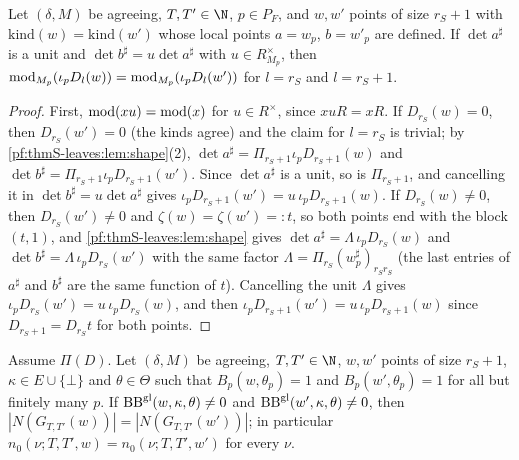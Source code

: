 \begin{lemma}\label{pf:thmS-leaves:lem:modk}
Let $(\delta,M)$ be agreeing, $T,T'\in\N$, $p\in P_F$, and $w,w'$ points of size $r_S+1$ with
$\mathrm{kind}(w)=\mathrm{kind}(w')$ whose local points $a=w_p$, $b=w'_p$ are defined. If $\det a^\sharp$ is a unit and
$\det b^\sharp=u\det a^\sharp$ with $u\in R_{M_p}^\times$, then $\mathrm{mod}_{M_p}(\iota_pD_l(w))=\mathrm{mod}_{M_p}(\iota_pD_l(w'))$
for $l=r_S$ and $l=r_S+1$.
\end{lemma}

\begin{proof}
First, $\mathrm{mod}(xu)=\mathrm{mod}(x)$ for $u\in R^\times$, since $xuR=xR$. If $D_{r_S}(w)=0$, then $D_{r_S}(w')=0$
(the kinds agree) and the claim for $l=r_S$ is trivial; by \cref{pf:thmS-leaves:lem:shape}(2),
$\det a^\sharp=\Pi_{r_S+1}\iota_pD_{r_S+1}(w)$ and $\det b^\sharp=\Pi_{r_S+1}\iota_pD_{r_S+1}(w')$. Since $\det a^\sharp$ is a
unit, so is $\Pi_{r_S+1}$, and cancelling it in $\det b^\sharp=u\det a^\sharp$ gives $\iota_pD_{r_S+1}(w')=u\,\iota_pD_{r_S+1}(w)$.
If $D_{r_S}(w)\ne0$, then $D_{r_S}(w')\ne0$ and $\zeta(w)=\zeta(w')=:t$, so both points end with the block $(t,1)$, and
\cref{pf:thmS-leaves:lem:shape} gives $\det a^\sharp=\Lambda\,\iota_pD_{r_S}(w)$ and $\det b^\sharp=\Lambda\,\iota_pD_{r_S}(w')$ with
the same factor $\Lambda=\Pi_{r_S}(w_p^\sharp)_{r_Sr_S}$ (the last entries of $a^\sharp$ and $b^\sharp$ are the same function of
$t$). Cancelling the unit $\Lambda$ gives $\iota_pD_{r_S}(w')=u\,\iota_pD_{r_S}(w)$, and then $\iota_pD_{r_S+1}(w')=u\,\iota_pD_{r_S+1}(w)$
since $D_{r_S+1}=D_{r_S}t$ for both points.
\end{proof}

\begin{proposition}\label{pf:thmS-leaves:prop:support}
Assume $\Pi(D)$. Let $(\delta,M)$ be agreeing, $T,T'\in\N$, $w,w'$ points of size $r_S+1$, $\kappa\in E\cup\{\bot\}$ and
$\theta\in\Theta$ such that $B_p(w,\theta_p)=1$ and $B_p(w',\theta_p)=1$ for all but finitely many $p$. If
$\mathrm{BB}^{\mathrm{gl}}(w,\kappa,\theta)\ne0$ and $\mathrm{BB}^{\mathrm{gl}}(w',\kappa,\theta)\ne0$, then $|N(G_{T,T'}(w))|=|N(G_{T,T'}(w'))|$; in
particular $n_0(\nu;T,T',w)=n_0(\nu;T,T',w')$ for every $\nu$.
\end{proposition}

